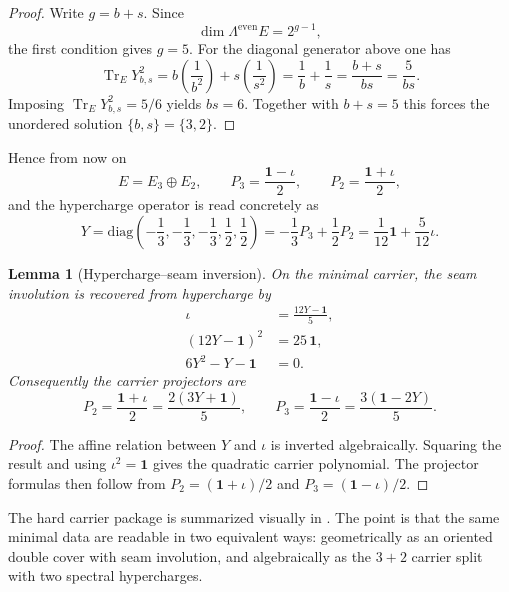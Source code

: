 \documentclass[11pt,a4paper]{article}
\newtheorem{lemma}[theorem]{Lemma}
\theoremstyle{definition}
\theoremstyle{remark}
\DeclareMathOperator{\tr}{Tr}
\newcommand{\inv}{\iota}
\begin{document}
\begin{proof}
Write $g=b+s$. Since
\[
\dim \Lambda^{\mathrm{even}}E=2^{g-1},
\]
the first condition gives $g=5$. For the diagonal generator above one has
\[
\tr_E Y_{b,s}^2
=
b\left(\frac{1}{b^2}\right)+s\left(\frac{1}{s^2}\right)
=
\frac1b+\frac1s
=
\frac{b+s}{bs}
=
\frac{5}{bs}.
\]
Imposing $\tr_E Y_{b,s}^2=5/6$ yields $bs=6$. Together with $b+s=5$ this forces the unordered solution $\{b,s\}=\{3,2\}$.
\end{proof}

Hence from now on
\[
E=E_3\oplus E_2,
\qquad
P_3=\frac{\mathbf 1-\inv}{2},
\qquad
P_2=\frac{\mathbf 1+\inv}{2},
\]
and the hypercharge operator is read concretely as
\begin{equation}
\label{eq:explicit-hypercharge}
Y
=
\mathrm{diag}\!\left(-\frac13,-\frac13,-\frac13,\frac12,\frac12\right)
=
-\frac13 P_3+\frac12 P_2
=
\frac1{12}\mathbf 1+\frac5{12}\inv.
\end{equation}

\begin{lemma}[Hypercharge--seam inversion]
On the minimal carrier, the seam involution is recovered from hypercharge by
\begin{align}
\inv&=\frac{12Y-\mathbf 1}{5},
\label{eq:hypercharge-seam-inversion}\\
(12Y-\mathbf 1)^2&=25\,\mathbf 1,
\nonumber\\
6Y^2-Y-\mathbf 1&=0.
\label{eq:carrier-polynomial}
\end{align}
Consequently the carrier projectors are
\[
P_2=\frac{\mathbf 1+\inv}{2}=\frac{2(3Y+\mathbf 1)}{5},
\qquad
P_3=\frac{\mathbf 1-\inv}{2}=\frac{3(\mathbf 1-2Y)}{5}.
\]
\end{lemma}

\begin{proof}
The affine relation between $Y$ and $\inv$ is inverted algebraically. Squaring the result and using $\inv^2=\mathbf 1$ gives the quadratic carrier polynomial. The projector formulas then follow from $P_2=(\mathbf 1+\inv)/2$ and $P_3=(\mathbf 1-\inv)/2$.
\end{proof}

The hard carrier package is summarized visually in . The point is that the same minimal data are readable in two equivalent ways: geometrically as an oriented double cover with seam involution, and algebraically as the $3+2$ carrier split with two spectral hypercharges.
\end{document}
